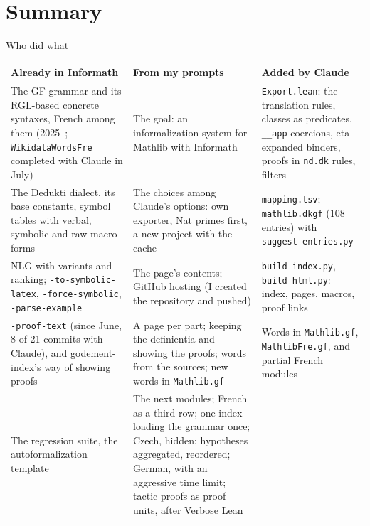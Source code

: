 \documentclass[10pt,aspectratio=169]{beamer}
\begin{document}

\section{Summary}

\begin{frame}{Who did what}
  \tiny
  \renewcommand{\arraystretch}{0.84}\setlength{\tabcolsep}{3pt}\begin{tabularx}{\textwidth}{@{}>{\raggedright\arraybackslash}X>{\raggedright\arraybackslash}X>{\raggedright\arraybackslash}X@{}}
    \toprule
    \textbf{Already in Informath} & \textbf{From my prompts} & \textbf{Added by Claude} \\
    \midrule
    The GF grammar and its RGL-based concrete syntaxes, French among them
    (2025--; \texttt{WikidataWordsFre} completed with Claude in July)
    &
    The goal: an informalization system for Mathlib with Informath
    &
    \texttt{Export.lean}: the translation rules, classes as predicates,
    \texttt{\_\_app} coercions, eta-expanded binders, proofs in \texttt{nd.dk}
    rules, filters \\
    The Dedukti dialect, its base constants, symbol tables with verbal,
    symbolic and raw macro forms
    &
    The choices among Claude's options: own exporter, Nat primes first, a new
    project with the cache
    &
    \texttt{mapping.tsv}; \texttt{mathlib.dkgf} (108 entries) with
    \texttt{suggest-entries.py} \\
    NLG with variants and ranking; \texttt{-to-symbolic-latex},
    \texttt{-force-symbolic}, \texttt{-parse-example}
    &
    The page's contents; GitHub hosting (I created the repository and pushed)
    &
    \texttt{build-index.py}, \texttt{build-html.py}: index, pages, macros,
    proof links \\
    \texttt{-proof-text} (since June, 8 of 21 commits with Claude), and
    godement-index's way of showing proofs
    &
    A page per part; keeping the definientia and showing the proofs;
    words from the sources; new words in \texttt{Mathlib.gf}
    &
    Words in \texttt{Mathlib.gf}, \texttt{MathlibFre.gf}, and partial French
    modules \\
    The regression suite, the autoformalization template
    &
    The next modules; French as a third row; one index loading the grammar
    once; Czech, hidden; hypotheses aggregated, reordered; German, with an aggressive time limit;
    tactic proofs as proof units, after Verbose Lean

\end{tabularx}
\end{frame}
\end{document}
